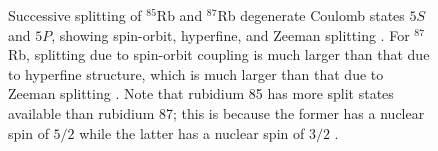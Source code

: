 \documentclass[11pt]{article}
\begin{document}
\begin{figure}[H]
  \centering
  \resizebox{0.72\textwidth}{!}{}

  \vspace{0.4em}

  \resizebox{0.72\textwidth}{!}{}
  \caption{Successive splitting of $^{85}$Rb and
    $^{87}$Rb degenerate Coulomb states $5S$ and $5P$, showing spin-orbit,
    hyperfine, and Zeeman splitting \cite{harris}. For $^{87}$Rb,
    splitting due to
    spin-orbit coupling is much larger than that due to hyperfine
    structure, which is much larger than that due to Zeeman
    splitting \cite{harris}. Note that rubidium 85 has more split states
    available than rubidium 87; this is because the former has a
    nuclear spin of $5/2$ while the latter has a nuclear spin of
    $3/2$ \cite{harris}.
  }
  \label{fig:rb_splitting}
  \label{fig:rb87_splitting}
\end{figure}

%
%   

\end{document}
